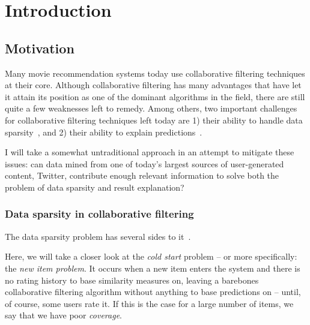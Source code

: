 
\chapter{Introduction} %

\label{Chapter1} %




\section{Motivation}

Many movie recommendation systems today use collaborative filtering techniques at their core. Although collaborative filtering has many advantages that have let it attain its position as one of the dominant algorithms in the field, there are still quite a few weaknesses left to remedy. Among others, two important challenges for collaborative filtering techniques left today are 1) their ability to handle data sparsity~\cite{Su:2009:SCF:1592474.1722966}, and 2) their ability to explain predictions~\cite{Herlocker:2000:ECF:358916.358995}.

I will take a somewhat untraditional approach in an attempt to mitigate these issues: can data mined from one of today's largest sources of user-generated content, Twitter, contribute enough relevant information to solve both the problem of data sparsity and result explanation?

\subsection{Data sparsity in collaborative filtering}

The data sparsity problem has several sides to it~\cite{Su:2009:SCF:1592474.1722966}.

Here, we will take a closer look at the \emph{cold start} problem -- or more specifically: the \emph{new item problem}. It occurs when a new item enters the system and there is no rating history to base similarity measures on, leaving a barebones collaborative filtering algorithm without anything to base predictions on -- until, of course, some users rate it. If this is the case for a large number of items, we say that we have poor \emph{coverage}.

